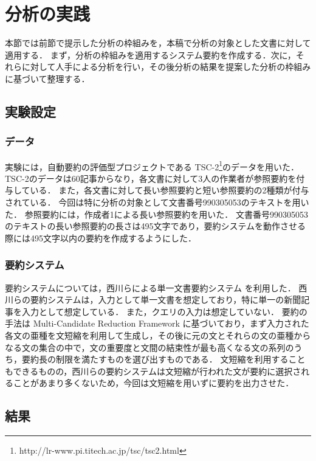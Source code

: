 \section{分析の実践}
\label{sc:分析の実践}

本節では前節で提示した分析の枠組みを，本稿で分析の対象とした文書に対して適用する．
まず，分析の枠組みを適用するシステム要約を作成する．次に，それらに対して人手による分析を行い，その後分析の結果を提案した分析の枠組みに基づいて整理する．


\subsection{実験設定}\label{sc:実験設定}

\subsubsection{データ}\label{sc:データ}

実験には，自動要約の評価型プロジェクトである TSC-2\footnote{
http://lr-www.pi.titech.ac.jp/tsc/tsc2.html}のデータを用いた．
TSC-2のデータは60記事からなり，各文書に対して3人の作業者が参照要約を付与している．
また，各文書に対して長い参照要約と短い参照要約の2種類が付与されている．
今回は特に分析の対象として文書番号990305053のテキストを用いた．
参照要約には，作成者1による長い参照要約を用いた．
文書番号990305053のテキストの長い参照要約の長さは495文字であり，要約システムを動作させる際には495文字以内の要約を作成するようにした．


\subsubsection{要約システム}
\label{sc:要約システム}

要約システムについては，西川らによる単一文書要約システム \cite{nishikawa14b} を利用した．
西川らの要約システムは，入力として単一文書を想定しており，特に単一の新聞記事を入力として想定している．
また，クエリの入力は想定していない．
要約の手法は Multi-Candidate Reduction Framework \cite{zajic07,jurafsky08} に基づいており，まず入力された各文の亜種を文短縮を利用して生成し，その後に元の文とそれらの文の亜種からなる文の集合の中で，文の重要度と文間の結束性が最も高くなる文の系列のうち，要約長の制限を満たすものを選び出すものである．
文短縮を利用することもできるものの，西川らの要約システムは文短縮が行われた文が要約に選択されることがあまり多くないため，今回は文短縮を用いずに要約を出力させた．


\subsection{結果}


